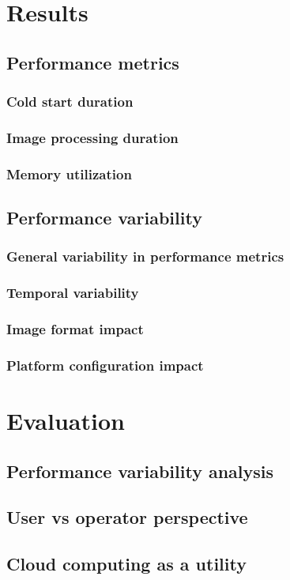 \section{Results}
\label{cha:results}

\subsection{Performance metrics}
\subsubsection{Cold start duration}
\subsubsection{Image processing duration}
\subsubsection{Memory utilization}

\subsection{Performance variability}
\subsubsection{General variability in performance metrics}
\subsubsection{Temporal variability}
\subsubsection{Image format impact}
\subsubsection{Platform configuration impact}



\clearpage
\section{Evaluation}
\label{cha:evaluation}

\subsection{Performance variability analysis}
\subsection{User vs operator perspective}
\subsection{Cloud computing as a utility}
